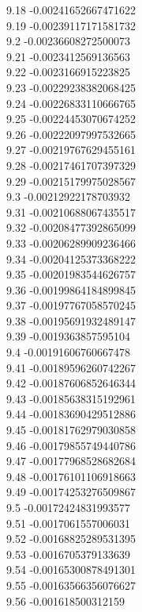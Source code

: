 {9.18	-0.00241652667471622\\
9.19	-0.00239117171581732\\
9.2	-0.00236608272500073\\
9.21	-0.0023412569136563\\
9.22	-0.0023166915223825\\
9.23	-0.00229238382068425\\
9.24	-0.00226833110666765\\
9.25	-0.00224453070674252\\
9.26	-0.00222097997532665\\
9.27	-0.00219767629455161\\
9.28	-0.00217461707397329\\
9.29	-0.00215179975028567\\
9.3	-0.00212922178703932\\
9.31	-0.00210688067435517\\
9.32	-0.00208477392865099\\
9.33	-0.00206289909236466\\
9.34	-0.00204125373368222\\
9.35	-0.00201983544626757\\
9.36	-0.00199864184899845\\
9.37	-0.00197767058570245\\
9.38	-0.00195691932489147\\
9.39	-0.0019363857595104\\
9.4	-0.00191606760667478\\
9.41	-0.00189596260742267\\
9.42	-0.00187606852646344\\
9.43	-0.00185638315192961\\
9.44	-0.00183690429512886\\
9.45	-0.00181762979030858\\
9.46	-0.00179855749440786\\
9.47	-0.00177968528682684\\
9.48	-0.00176101106918663\\
9.49	-0.00174253276509867\\
9.5	-0.00172424831993577\\
9.51	-0.0017061557006031\\
9.52	-0.00168825289531395\\
9.53	-0.0016705379133639\\
9.54	-0.00165300878491301\\
9.55	-0.00163566356076627\\
9.56	-0.001618500312159\\
}
